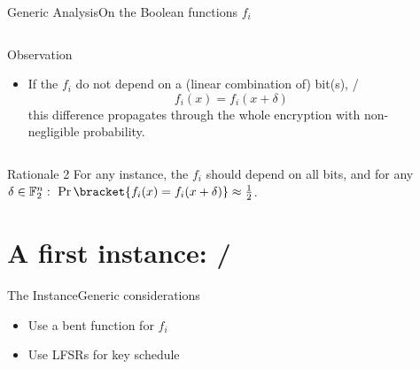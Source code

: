 \begin{frame}{Generic Analysis}{On the Boolean functions $f_i$}
    \begin{columns}
        \begin{column}{0.49\textwidth}
            \begin{block}{Observation}
                \begin{itemize}
                    \item If the $f_i$ do not depend on a (linear combination of) bit(s), \ie/
                        \begin{equation*}
                            f_i(x) = f_i(x + \delta)
                        \end{equation*}
                        this difference propagates through the whole encryption with non-negligible probability.
                \end{itemize}
            \end{block}
        \end{column}
        \begin{column}{0.49\textwidth}
            \begin{block}{}
            \end{block}
        \end{column}
    \end{columns}
    \hspace*{-8.5pt}
    \begin{minipage}{1.0145\textwidth}
    \begin{exampleblock}{Rationale 2}
        For any instance, the $f_i$ should depend on all bits, and for any $\delta \in \F_2^n:\ \Pr\bracket{f_i(x) = f_i(x + \delta)} \approx \frac{1}{2}$.
    \end{exampleblock}
    \end{minipage}
\end{frame}

\section{A first instance: \bison/}
\begin{frame}{The Instance}{Generic considerations}
    \begin{itemize}
        \item Use a bent function for $f_i$
        \item Use LFSRs for key schedule
    \end{itemize}
\end{frame}

